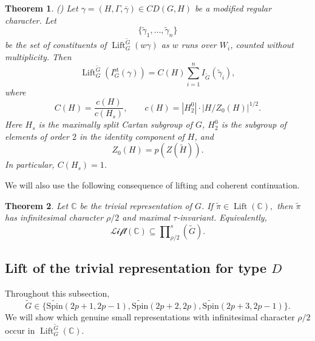 \documentclass{amsart}
\DeclareMathOperator{\Lift}{Lift}
\newcommand{\LLift}{\mathscr{Lift}}
\newcommand{\bbC}{{\mathbb{C}}}
\newcommand{\Spin}{{\mathrm{Spin}}}
\newtheorem{thm}{Theorem}[section]
\theoremstyle{definition}
\newcommand{\tu}{\widetilde}
\begin{document}
\begin{thm}\label{t:lift-stable-standard}
\emph{(\cite[Corollary 19.8]{AHe10})}
Let $\gamma=(H,\Gamma,\overline\gamma)\in CD(G,H)$ be a modified regular character. Let
\begin{equation*}
\{\tu\gamma_1,\ldots,\tu\gamma_n\}
\end{equation*}
be the set of constituents of $\Lift_G^{\tu G}(w\gamma)$ as $w$ runs over $W_i$, counted without multiplicity. Then
\begin{equation*}
\Lift_G^{\tu G}(I_G^{\mathrm{st}}(\gamma))
=
C(H)\sum_{i=1}^{n} I_{\tu G}(\tu\gamma_i),
\end{equation*}
where
\begin{equation*}
C(H)=\frac{c(H)}{c(H_s)},
\qquad
c(H)=|H_2^0|\cdot |H/Z_0(H)|^{1/2}.
\end{equation*}
Here $H_s$ is the maximally split Cartan subgroup of $G$, $H_2^0$ is the subgroup of elements of order $2$ in the identity component of $H$, and
\begin{equation*}
Z_0(H)=p(Z(\tu H)).
\end{equation*}
In particular, $C(H_s)=1$.
\end{thm}

We will also use the following consequence of lifting and coherent continuation.

\begin{thm} \cite[Theorem 4.1]{Ts23}  \label{t:lift-trivial-small} 
Let $\bbC$ be the trivial representation of $G$. If
$\tu\pi\in \Lift (\bbC),$ then $\tu\pi$ has infinitesimal character $\rho/2$ and maximal $\tau$-invariant. Equivalently,
\begin{equation*}
\LLift (\bbC)
\subseteq
\prod\nolimits_{\rho/2}^{s}(\tu G).
\end{equation*}
\end{thm}



\subsection{Lift of the trivial representation for type $D$}
Throughout this subsection, $$\tu G\in\{\tu\Spin(2p+1,2p-1),\tu\Spin(2p+2,2p), \tu\Spin(2p+3, 2p-1)\}.$$ We will show which  genuine small representations with infinitesimal character $\rho/2$ occur in $\Lift_G^{\tu G}(\bbC)$. 
\end{document}
